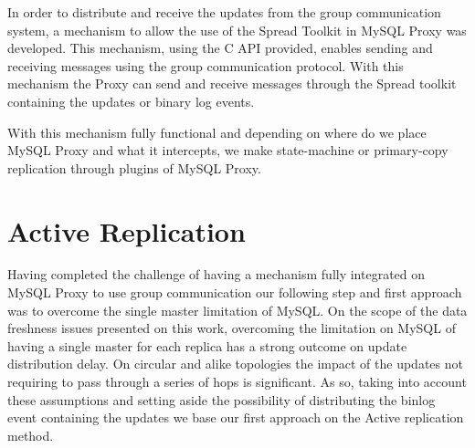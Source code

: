 In order to distribute and receive the updates from the group communication system, a mechanism to allow the use of the Spread Toolkit in MySQL Proxy was developed. This mechanism, using the C API provided, enables sending and receiving messages using the group communication protocol. With this mechanism the Proxy can send and receive messages through the Spread toolkit containing the updates or binary log events.

With this mechanism fully functional and depending on where do we place MySQL Proxy and what it intercepts, we make state-machine or primary-copy replication through plugins of MySQL Proxy.










\section{Active Replication}


Having completed the challenge of having a mechanism fully integrated on MySQL Proxy to use group communication our following step and first approach was to overcome the single master limitation of MySQL. On the scope of the data freshness issues presented on this work, overcoming the limitation on MySQL of having a single master for each replica has a strong outcome on update distribution delay. On circular and alike topologies the impact of the updates not requiring to pass through a series of hops is significant. As so, taking into account these assumptions and setting aside the possibility of distributing the binlog event containing the updates we base our first approach on the Active replication method.\\

